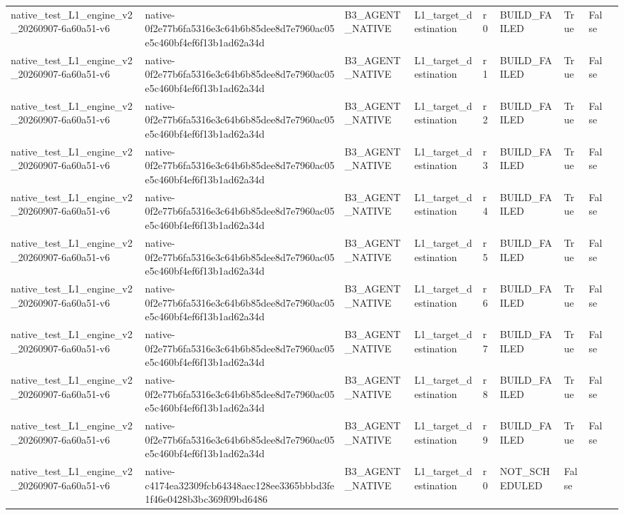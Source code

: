 \begin{tabular}{lllllllll}
native\_test\_L1\_engine\_v2\_20260907-6a60a51-v6 & native-0f2e77b6fa5316e3c64b6b85dee8d7e7960ac05e5c460bf4ef6f13b1ad62a34d & B3\_AGENT\_NATIVE & L1\_target\_destination & r0 & BUILD\_FAILED & True & False &  \\
native\_test\_L1\_engine\_v2\_20260907-6a60a51-v6 & native-0f2e77b6fa5316e3c64b6b85dee8d7e7960ac05e5c460bf4ef6f13b1ad62a34d & B3\_AGENT\_NATIVE & L1\_target\_destination & r1 & BUILD\_FAILED & True & False &  \\
native\_test\_L1\_engine\_v2\_20260907-6a60a51-v6 & native-0f2e77b6fa5316e3c64b6b85dee8d7e7960ac05e5c460bf4ef6f13b1ad62a34d & B3\_AGENT\_NATIVE & L1\_target\_destination & r2 & BUILD\_FAILED & True & False &  \\
native\_test\_L1\_engine\_v2\_20260907-6a60a51-v6 & native-0f2e77b6fa5316e3c64b6b85dee8d7e7960ac05e5c460bf4ef6f13b1ad62a34d & B3\_AGENT\_NATIVE & L1\_target\_destination & r3 & BUILD\_FAILED & True & False &  \\
native\_test\_L1\_engine\_v2\_20260907-6a60a51-v6 & native-0f2e77b6fa5316e3c64b6b85dee8d7e7960ac05e5c460bf4ef6f13b1ad62a34d & B3\_AGENT\_NATIVE & L1\_target\_destination & r4 & BUILD\_FAILED & True & False &  \\
native\_test\_L1\_engine\_v2\_20260907-6a60a51-v6 & native-0f2e77b6fa5316e3c64b6b85dee8d7e7960ac05e5c460bf4ef6f13b1ad62a34d & B3\_AGENT\_NATIVE & L1\_target\_destination & r5 & BUILD\_FAILED & True & False &  \\
native\_test\_L1\_engine\_v2\_20260907-6a60a51-v6 & native-0f2e77b6fa5316e3c64b6b85dee8d7e7960ac05e5c460bf4ef6f13b1ad62a34d & B3\_AGENT\_NATIVE & L1\_target\_destination & r6 & BUILD\_FAILED & True & False &  \\
native\_test\_L1\_engine\_v2\_20260907-6a60a51-v6 & native-0f2e77b6fa5316e3c64b6b85dee8d7e7960ac05e5c460bf4ef6f13b1ad62a34d & B3\_AGENT\_NATIVE & L1\_target\_destination & r7 & BUILD\_FAILED & True & False &  \\
native\_test\_L1\_engine\_v2\_20260907-6a60a51-v6 & native-0f2e77b6fa5316e3c64b6b85dee8d7e7960ac05e5c460bf4ef6f13b1ad62a34d & B3\_AGENT\_NATIVE & L1\_target\_destination & r8 & BUILD\_FAILED & True & False &  \\
native\_test\_L1\_engine\_v2\_20260907-6a60a51-v6 & native-0f2e77b6fa5316e3c64b6b85dee8d7e7960ac05e5c460bf4ef6f13b1ad62a34d & B3\_AGENT\_NATIVE & L1\_target\_destination & r9 & BUILD\_FAILED & True & False &  \\
native\_test\_L1\_engine\_v2\_20260907-6a60a51-v6 & native-c4174ea32309fcb64348aec128ee3365bbbd3fe1f46e0428b3bc369f09bd6486 & B3\_AGENT\_NATIVE & L1\_target\_destination & r0 & NOT\_SCHEDULED & False &  &  \\

\end{tabular}
